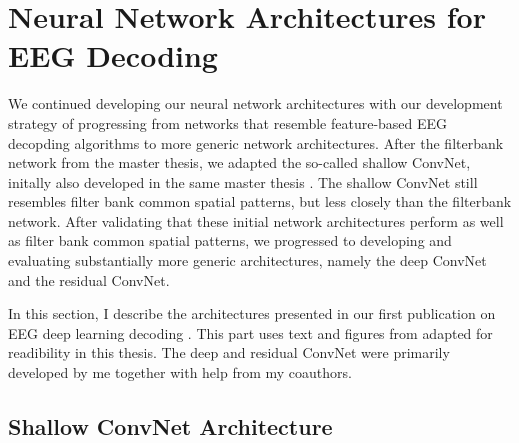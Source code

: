\chapter{Neural Network Architectures for
EEG Decoding}\label{network-architectures}



We continued developing our neural network architectures with our
development strategy of progressing from networks that resemble
feature-based EEG decopding algorithms to more generic network
architectures. After the filterbank network from the master thesis, we
adapted the so-called shallow ConvNet, initally also developed in the
same master thesis \citep{schirrmeister_msc_thesis_2015}.
The shallow ConvNet still resembles filter bank common spatial patterns,
but less closely than the filterbank network. After validating that
these initial network architectures perform as well as filter bank
common spatial patterns, we progressed to developing and evaluating
substantially more generic architectures, namely the deep ConvNet and
the residual ConvNet.

In this section, I describe the architectures presented in our first
publication on EEG deep learning decoding
\citep{schirrmeisterdeephbm2017}. This part uses text and
figures from \citep{schirrmeisterdeephbm2017} adapted for
readibility in this thesis. The deep and residual ConvNet were primarily
developed by me together with help from my coauthors.


    \hypertarget{shallow-convnet-architecture}{%
\section{Shallow ConvNet
Architecture}\label{shallow-convnet-architecture}}

% 

